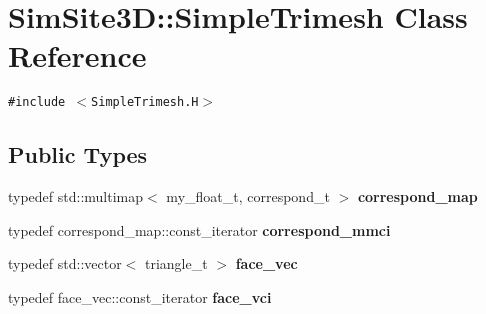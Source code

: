 \section{SimSite3D::Simple\-Trimesh Class Reference}
\label{classSimSite3D_1_1SimpleTrimesh}
{\tt \#include $<$Simple\-Trimesh.H$>$}

\subsection*{Public Types}
\begin{CompactItemize}
\item 
typedef std::multimap$<$ my\_\-float\_\-t, correspond\_\-t $>$ \textbf{correspond\_\-map}\label{classSimSite3D_1_1SimpleTrimesh_2ca3d7877ebea7cd14caed7b69916786}

\item 
typedef correspond\_\-map::const\_\-iterator \textbf{correspond\_\-mmci}\label{classSimSite3D_1_1SimpleTrimesh_cf7601a2bd1e9a025743c55b2c41db20}

\item 
typedef std::vector$<$ triangle\_\-t $>$ \textbf{face\_\-vec}\label{classSimSite3D_1_1SimpleTrimesh_abdd82d831b014f4e94e2af71ab8ae7a}

\item 
typedef face\_\-vec::const\_\-iterator \textbf{face\_\-vci}\label{classSimSite3D_1_1SimpleTrimesh_b4de70c1cdbd9ce9d95ccf9d0986b7e1}

\end{CompactItemize}
